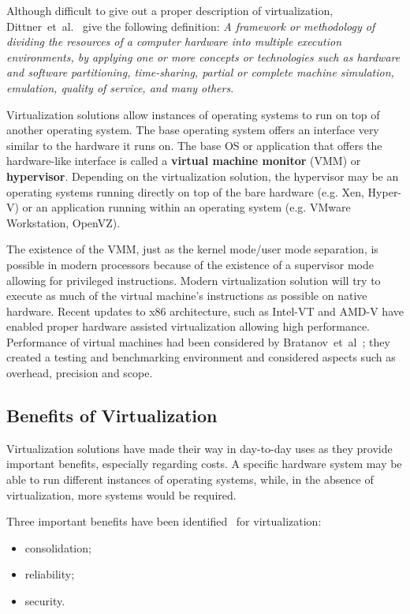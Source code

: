 Although difficult to give out a proper description of virtualization, Dittner~et~al.~\cite{best-damn-virt} give the following definition: \textit{A framework
or methodology of dividing the resources of a computer hardware into multiple
execution environments, by applying one or more concepts or technologies such
as hardware and software partitioning, time-sharing, partial or complete
machine simulation, emulation, quality of service, and many others}.

Virtualization solutions allow instances of operating systems to run on top of
another operating system. The base operating system offers an interface very
similar to the hardware it runs on. The base OS or application that offers the
hardware-like interface is called a \textbf{virtual machine monitor} (VMM) or
\textbf{hypervisor}. Depending on the virtualization solution, the hypervisor
may be an operating systems running directly on top of the bare hardware (e.g.
Xen, Hyper-V) or an application running within an operating system (e.g.
VMware Workstation, OpenVZ).

The existence of the VMM, just as the kernel mode/user mode separation, is
possible in modern processors because of the existence of a supervisor mode
allowing for privileged instructions. Modern virtualization solution will try
to execute as much of the virtual machine's instructions as possible on native
hardware. Recent updates to x86 architecture, such as Intel-VT and AMD-V have
enabled proper hardware assisted virtualization allowing high performance.
Performance of virtual machines had been considered by
Bratanov~et~al~\cite{virt-perf}; they created a testing and benchmarking
environment and considered aspects such as overhead, precision and scope.

\subsection{Benefits of Virtualization}

Virtualization solutions have made their way in day-to-day uses as they
provide important benefits, especially regarding costs. A specific hardware
system may be able to run different instances of operating systems, while, in
the absence of virtualization, more systems would be required.

Three important benefits have been identified~\cite{best-damn-virt} for
virtualization:

\begin{itemize}
  \item consolidation;
  \item reliability;
  \item security.
\end{itemize}

